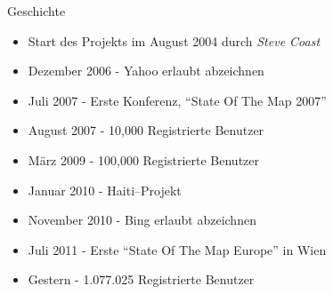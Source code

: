 \documentclass{beamer}
\begin{document}
{

\begin{frame}{Geschichte}


\vspace{2cm}

\begin{itemize}
  \item Start des Projekts im August 2004 durch \emph{Steve Coast}
  \item Dezember 2006 - Yahoo erlaubt abzeichnen
  \item Juli 2007 - Erste Konferenz, ``State Of The Map 2007''
  \item August 2007 - 10,000 Registrierte Benutzer
  \item März 2009 - 100,000 Registrierte Benutzer
  \item Januar 2010 - Haiti--Projekt
  \item November 2010 - Bing erlaubt abzeichnen
  \item Juli 2011 - Erste ``State Of The Map Europe'' in Wien
  \item Gestern - 1.077.025 Registrierte Benutzer
\end{itemize}


\end{frame}

}
\end{document}
